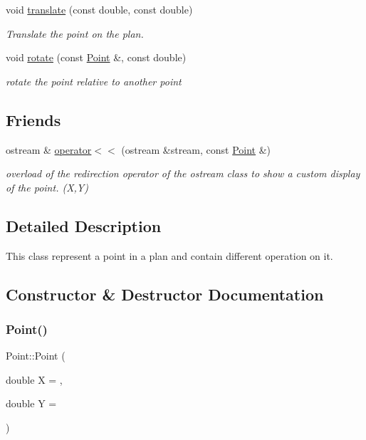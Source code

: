 \begin{DoxyCompactItemize}
void \hyperlink{class_point_a57287a060ea145f69d3d4eb484e64d64}{translate} (const double, const double)
\begin{DoxyCompactList}\small\item\em Translate the point on the plan. \end{DoxyCompactList}\item 
void \hyperlink{class_point_a698b03ed343ee2971a279ed196e80b6b}{rotate} (const \hyperlink{class_point}{Point} \&, const double)
\begin{DoxyCompactList}\small\item\em rotate the point relative to another point \end{DoxyCompactList}\end{DoxyCompactItemize}
\subsection*{Friends}
\begin{DoxyCompactItemize}
\item 
ostream \& \hyperlink{class_point_a2cb585eaed961c31bb595dfa36f98bf8}{operator$<$$<$} (ostream \&stream, const \hyperlink{class_point}{Point} \&)
\begin{DoxyCompactList}\small\item\em overload of the redirection operator of the ostream class to show a custom display of the point. (X,Y) \end{DoxyCompactList}\end{DoxyCompactItemize}


\subsection{Detailed Description}
This class represent a point in a plan and contain different operation on it. 

\subsection{Constructor \& Destructor Documentation}
\hypertarget{class_point_aafb618df00f36c0bcbec778511f6a3f7}{}\label{class_point_aafb618df00f36c0bcbec778511f6a3f7} 
\subsubsection{\texorpdfstring{Point()}{Point()}}
{\footnotesize\ttfamily Point\+::\+Point (\begin{DoxyParamCaption}\item[{double}]{X = {},  }\item[{double}]{Y = {} }\end{DoxyParamCaption})}



